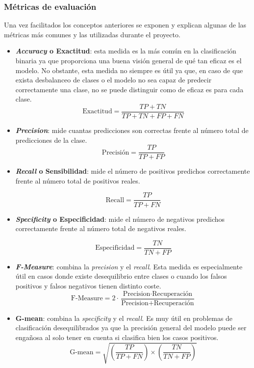 \subsubsection{Métricas de evaluación}
Una vez facilitados los conceptos anteriores se exponen y explican algunas de las métricas más comunes y las utilizadas durante el proyecto.
\begin{itemize}

\item \textbf{\textit{Accuracy} o Exactitud}: esta medida es la más común en la clasificación binaria ya que proporciona una buena visión general de qué tan eficaz es el modelo. No obstante, esta medida no siempre es útil ya que, en caso de que exista desbalanceo de clases o el modelo no sea capaz de predecir correctamente una clase, no se puede distinguir como de eficaz es para cada clase.
\begin{equation}
\text{Exactitud} = \frac{TP + TN}{TP + TN + FP + FN}
\end{equation}
\item \textbf{\textit{Precision}}: mide cuantas predicciones son correctas frente al número total de predicciones de la clase.
\begin{equation}
\text{Precisión} = \frac{TP}{TP + FP}
\end{equation}
\item \textbf{\textit{Recall} o Sensibilidad}: mide el número de positivos predichos correctamente  frente al número total de positivos reales.

\begin{equation}
\text{Recall} = \frac{TP}{TP + FN}
\end{equation}
\item \textbf{\textit{Specificity} o Especificidad}: mide el número de negativos predichos correctamente  frente al número total de negativos reales.

\begin{equation}
\text{Especificidad} = \frac{TN}{TN + FP}
\end{equation}
\item \textbf{\textit{F-Measure}}: combina la \textit{precision} y el \textit{recall}. Esta medida es especialmente útil en casos donde existe desequilibrio entre clases o cuando los falsos positivos y falsos negativos tienen distinto coste.
\begin{equation}
\text{F-Measure} = 2 \cdot \frac{\text{Precision} \cdot \text{Recuperación}}{\text{Precision} + \text{Recuperación}}
\end{equation}

\item \textbf{G-mean}: combina la \textit{specificity} y el \textit{recall}. Es muy útil en problemas de clasificación desequilibrados ya que la precisión general del modelo puede ser engañosa al solo tener en cuenta si clasifica bien los casos positivos.
\begin{equation}
\text{G-mean} = \sqrt{\left( \frac{TP}{TP + FN} \right) \times \left( \frac{TN}{TN + FP} \right)}
\end{equation}

\end{itemize} 

